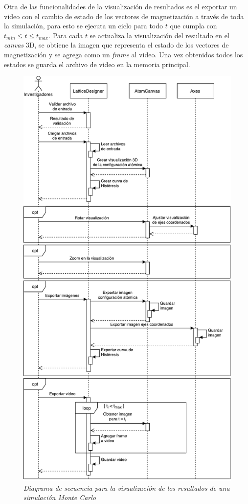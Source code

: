 Otra de las funcionalidades de la visualización de resultados es el exportar un video con el cambio de estado de los vectores de magnetización a través de toda la simulación, para esto se ejecuta un ciclo para todo $t$ que cumpla con $t_{min} \leq t \leq t_{max}$. Para cada $t$ se actualiza la visualización del resultado en el \emph{canvas} 3D, se obtiene la imagen que representa el estado de los vectores de magnetización y se agrega como un \emph{frame} al video. Una vez obtenidos todos los estados se guarda el archivo de video en la memoria principal.


\begin{figure}[ht]
  \centering
  \includegraphics[scale=.5]{images/DiagramaSecuenciaVisualizacion}
  \caption{\em Diagrama de secuencia para la visualización de los resultados de una simulación Monte Carlo}
  \label{fig:DiagramaSecuenciaVisualizacion}
\end{figure}


